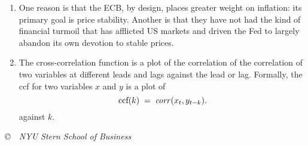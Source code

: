 \documentclass[letterpaper,12pt]{article}
\begin{document}
\begin{enumerate}
\begin{enumerate}
\item One reason is that the ECB, by design, 
places greater weight on inflation:  its primary goal is price stability.
Another is that they have not had the kind of financial turmoil
that has afflicted US markets and driven the Fed to 
largely abandon its own devotion to stable prices.  

\item The cross-correlation function is a plot of the correlation
of the correlation of two variables at different leads and lags
against the lead or lag.
Formally, the ccf for two variables $x$ and $y$ is a plot 
of 
\[
    \mbox{ccf}(k) \;=\;  \mbox{\it corr\/} (x_t,y_{t-k}) .
\]
against $k$.  


\end{enumerate}

\end{enumerate}



\vfill \centerline{\it \copyright \ \number\year \ 
NYU Stern School of Business}
\end{document}
